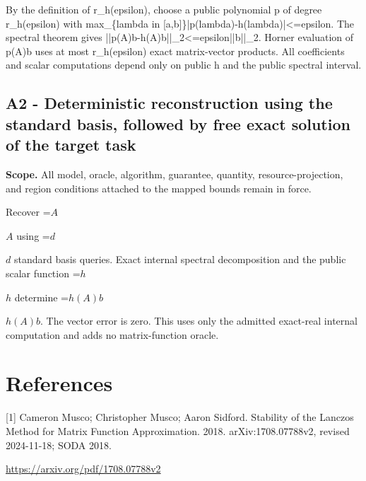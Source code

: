 \documentclass[10pt,a4paper]{article}
\newcommand{\AtlasMath}[1]{\par\begingroup\centering\setbox0=\hbox{$\displaystyle #1$}\ifdim\wd0>1.4\linewidth\typeout{ATLAS WIDE FORMULA: \the\wd0}\fi\ifdim\wd0>\linewidth\resizebox{\linewidth}{!}{\box0}\else\box0\fi\par\endgroup}
\newcommand{\AtlasInlineMath}[1]{\begingroup\setbox0=\hbox{$#1$}\ifdim\wd0>.4\linewidth\endgroup\AtlasMath{#1}\else\endgroup$#1$\fi}
\begin{document}
By the definition of r\_h(epsilon), choose a public polynomial p of degree r\_h(epsilon) with max\_\{lambda in [a,b]\}|p(lambda)-h(lambda)|<=epsilon. The spectral theorem gives ||p(A)b-h(A)b||\_2<=epsilon||b||\_2. Horner evaluation of p(A)b uses at most r\_h(epsilon) exact matrix-vector products. All coefficients and scalar computations depend only on public h and the public spectral interval.

\subsection{A2 - Deterministic reconstruction using the standard basis, followed by free exact solution of the target task}
\textbf{Scope.} All model, oracle, algorithm, guarantee, quantity, resource-projection, and region conditions attached to the mapped bounds remain in force.

Recover \AtlasInlineMath{A} using \AtlasInlineMath{d} standard basis queries. Exact internal spectral decomposition and the public scalar function \AtlasInlineMath{h} determine \AtlasInlineMath{h(A)b}. The vector error is zero. This uses only the admitted exact-real internal computation and adds no matrix-function oracle.

\section{References}
[1] Cameron Musco; Christopher Musco; Aaron Sidford. Stability of the Lanczos Method for Matrix Function Approximation. 2018. arXiv:1708.07788v2, revised 2024-11-18; SODA 2018.

\url{https://arxiv.org/pdf/1708.07788v2}
\end{document}
